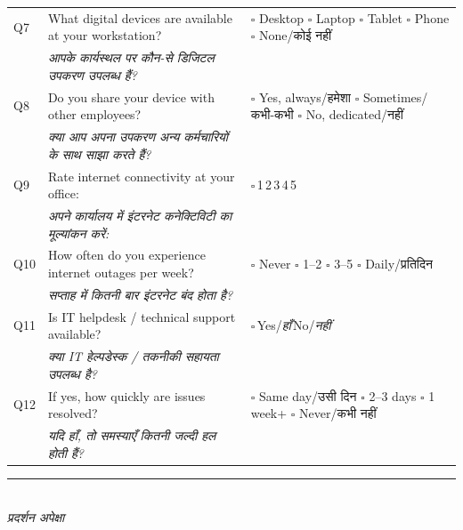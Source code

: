 \documentclass[10pt,a4paper]{article}
\newcommand{\likert}{{\Large$\square$}\,1\quad{\Large$\square$}\,2\quad{\Large$\square$}\,3\quad{\Large$\square$}\,4\quad{\Large$\square$}\,5}
\newcommand{\ymark}{{\Large$\square$}\,Yes/{\hindifont\itshape हाँ}\quad{\Large$\square$}\,No/{\hindifont\itshape नहीं}}
\begin{document}
\noindent\begin{tabularx}{\textwidth}{@{}L{0.8cm} X L{5.2cm}@{}}
Q7 & What digital devices are available at your workstation? & {\Large$\square$} Desktop {\Large$\square$} Laptop {\Large$\square$} Tablet {\Large$\square$} Phone {\Large$\square$} None/{\hindifont कोई नहीं} \\
 & {\hindifont\small\itshape\color{black!70} आपके कार्यस्थल पर कौन-से डिजिटल उपकरण उपलब्ध हैं?} & \\[3pt]
Q8 & Do you share your device with other employees? & {\Large$\square$} Yes, always/{\hindifont हमेशा} {\Large$\square$} Sometimes/{\hindifont कभी-कभी} {\Large$\square$} No, dedicated/{\hindifont नहीं} \\
 & {\hindifont\small\itshape\color{black!70} क्या आप अपना उपकरण अन्य कर्मचारियों के साथ साझा करते हैं?} & \\[3pt]
Q9 & Rate internet connectivity at your office: & \likert \\
 & {\hindifont\small\itshape\color{black!70} अपने कार्यालय में इंटरनेट कनेक्टिविटी का मूल्यांकन करें:} & \\[3pt]
Q10 & How often do you experience internet outages per week? & {\Large$\square$} Never {\Large$\square$} 1--2 {\Large$\square$} 3--5 {\Large$\square$} Daily/{\hindifont प्रतिदिन} \\
 & {\hindifont\small\itshape\color{black!70} सप्ताह में कितनी बार इंटरनेट बंद होता है?} & \\[3pt]
Q11 & Is IT helpdesk / technical support available? & \ymark \\
 & {\hindifont\small\itshape\color{black!70} क्या IT हेल्पडेस्क / तकनीकी सहायता उपलब्ध है?} & \\[3pt]
Q12 & If yes, how quickly are issues resolved? & {\Large$\square$} Same day/{\hindifont उसी दिन} {\Large$\square$} 2--3 days {\Large$\square$} 1 week+ {\Large$\square$} Never/{\hindifont कभी नहीं} \\
 & {\hindifont\small\itshape\color{black!70} यदि हाँ, तो समस्याएँ कितनी जल्दी हल होती हैं?} & \\[3pt]
\end{tabularx}
\vspace{4pt}
\noindent\rule{\textwidth}{0.3pt}\vspace{3pt}
\\
{\hindifont\itshape\color{black!70} प्रदर्शन अपेक्षा}\vspace{3pt}
\end{document}
